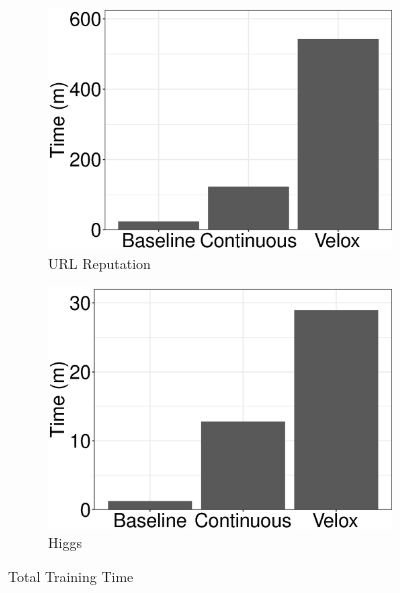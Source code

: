 \documentclass[10pt,conference,letterpaper]{IEEEtran}
\begin{document}
\begin{figure}[h]
\centering
\begin{subfigure}[b]{0.5\columnwidth}
	\includegraphics[width=\linewidth, height=\linewidth,keepaspectratio]{../images/experiment-results/url-reputation-times.eps}
	\caption{URL Reputation}
	\label{fig:url-times}
\end{subfigure}%
\begin{subfigure}[b]{0.5\columnwidth}
	\includegraphics[width=\linewidth, height=\linewidth,keepaspectratio]{../images/experiment-results/higgs-times.eps}
	\caption{Higgs}
	\label{fig:higgs-times}
\end{subfigure}
\vspace{2mm}
\caption{Total Training Time}
 \label{fig:cluster-training-time}
\end{figure}
\end{document}

